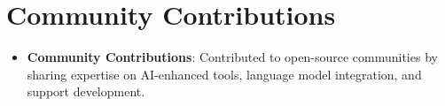 \documentclass[a4paper,10pt]{article}
\newcommand{\skill}[1]{\textbf{\textcolor{mysecondary}{#1}}}
\begin{document}
\section*{Community Contributions}
\begin{itemize}
    \item \skill{Community Contributions}: Contributed to open-source communities by sharing expertise on AI-enhanced tools, language model integration, and support development.
\end{itemize}
\end{document}
